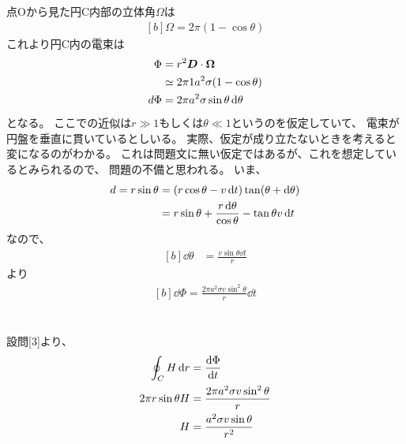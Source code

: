 \documentclass[../ap_2014.tex]{subfiles}
\begin{document}
\section{}
点Oから見た円C内部の立体角\(\Omega\)は
\begin{equation}\begin{aligned}[b]
    \Omega = 2\pi(1-\cos\theta)
\end{aligned}\end{equation}
これより円C内の電束は
\begin{equation}\begin{aligned}[b]
    \Phi &= r^2\vb*{D}\cdot\vb*{\Omega}\\
    &\simeq 2\pi 1a^2\sigma(1-\cos\theta)\\
    d\Phi&=2\pi a^2\sigma\sin\theta \dd{\theta}
\end{aligned}\end{equation}
となる。
ここでの近似は\(r\gg 1\)もしくは\(\theta \ll 1\)というのを仮定していて、
電束が円盤を垂直に貫いているとしいる。
実際、仮定が成り立たないときを考えると変になるのがわかる。
これは問題文に無い仮定ではあるが、これを想定しているとみられるので、
問題の不備と思われる。
いま、
\begin{equation}\begin{aligned}[b]
    d = r\sin\theta &= \qty(r\cos\theta - v\dd{t})\tan(\theta+\dd{\theta})\\
    &= r\sin\theta + \frac{r\dd{\theta}}{\cos\theta} -\tan\theta v\dd{t}
\end{aligned}\end{equation}
なので、
\begin{equation}\begin{aligned}[b]
    \dd{\theta} &= \frac{v\sin\theta \dd{t}}{r}
\end{aligned}\end{equation}
より
\begin{equation}\begin{aligned}[b]
    \dd{\Phi}=\frac{2\pi a^2\sigma v\sin^2\theta}{r}\dd{t}
\end{aligned}\end{equation}

\section{}
設問[3]より、
\begin{equation}\begin{aligned}[b]
    \oint_C H\dd{r}&=\dv{\Phi}{t}\\
    2\pi r\sin\theta H &= \frac{2\pi a^2\sigma v\sin^2\theta}{r}\\
    H &= \frac{a^2\sigma v\sin\theta}{r^2}
\end{aligned}\end{equation}
\end{document}
